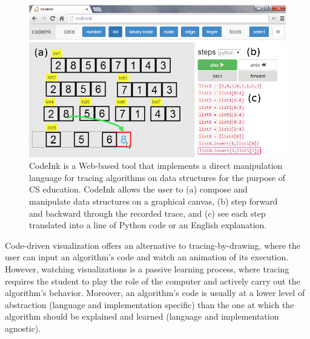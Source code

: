 \begin{figure}

\begin{center}
\includegraphics[width=\columnwidth]{img/frontpage-mergesort.png}
\end{center}

\vspace{-0.5em}

\caption{CodeInk is a Web-based tool that implements a direct
manipulation language for tracing algorithms on data structures for the
purpose of CS education. CodeInk allows the user to (a) compose and
manipulate data structures on a graphical canvas, (b) step forward and
backward through the recorded trace, and (c) see each step translated
into a line of Python code or an English explanation.}


\label{fig:codeink-intro}
\end{figure}

Code-driven visualization offers an alternative to tracing-by-drawing, where the
user can input an algorithm's code and watch an animation of its execution.
However, watching visualizations is a passive learning process, where tracing
requires the student to play the role of the computer and actively carry out the
algorithm's behavior. Moreover, an algorithm's code is usually at a lower level
of abstraction (language and implementation specific) than the one at which the
algorithm should be explained and learned (language and implementation
agnostic).

